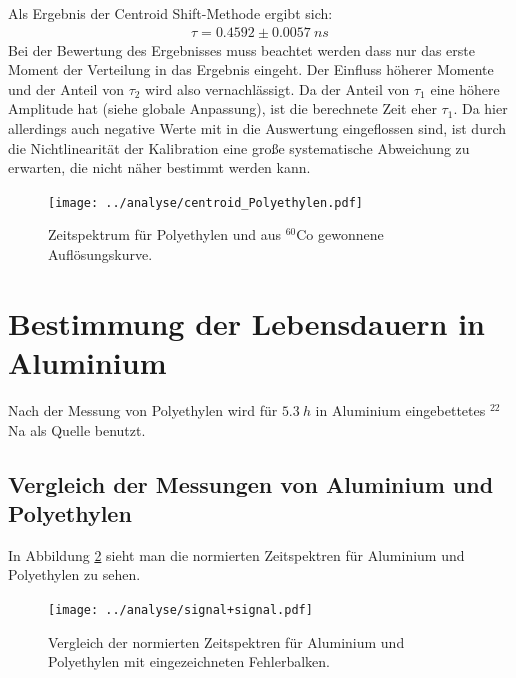 \documentclass[a4paper,12pt]{article}
\begin{document}
Als Ergebnis der Centroid Shift-Methode ergibt sich:
\begin{align*}
	τ = 0.4592 \pm \SI{0.0057}{ns}
\end{align*}  
Bei der Bewertung des Ergebnisses muss beachtet werden dass nur das
erste Moment der Verteilung in das Ergebnis eingeht. Der Einfluss höherer Momente und der Anteil von
$τ_2$ wird also vernachlässigt. Da der Anteil von $τ_1$ eine höhere Amplitude hat (siehe globale
Anpassung), ist die berechnete Zeit eher $τ_1$.
Da hier allerdings auch negative Werte mit in die Auswertung eingeflossen sind, ist durch die
Nichtlinearität der Kalibration eine große systematische Abweichung zu erwarten, die nicht näher
bestimmt werden kann.
\begin{figure}
	\texttt{[image: ../analyse/centroid\_Polyethylen.pdf]}
	\caption{Zeitspektrum für Polyethylen und aus $^{60}$Co gewonnene Auflösungskurve. }
	\label{fig:compare_signal}
\end{figure}

\section{Bestimmung der Lebensdauern in Aluminium}
Nach der Messung von Polyethylen wird für $\SI{5.3}{h}$ in Aluminium eingebettetes $^{22}$Na als Quelle benutzt.

\subsection{Vergleich der Messungen von Aluminium und Polyethylen}
In Abbildung \ref{fig:compare_signal} sieht man die normierten Zeitspektren für Aluminium und
Polyethylen zu sehen.
\begin{figure}[h]
	\texttt{[image: ../analyse/signal+signal.pdf]}
	\caption{Vergleich der normierten Zeitspektren für Aluminium und Polyethylen mit eingezeichneten Fehlerbalken.}
	\label{fig:compare_signal}
\end{figure}
\end{document}
